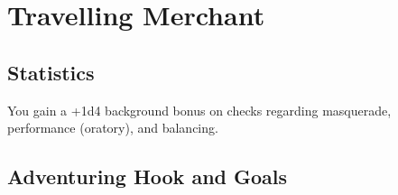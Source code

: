 \section{Travelling Merchant}\label{background:travellingMerchant}

\subsection{Statistics}
You gain a +1d4 background bonus on checks regarding masquerade, performance (oratory), and balancing.

\subsection{Adventuring Hook and Goals}
